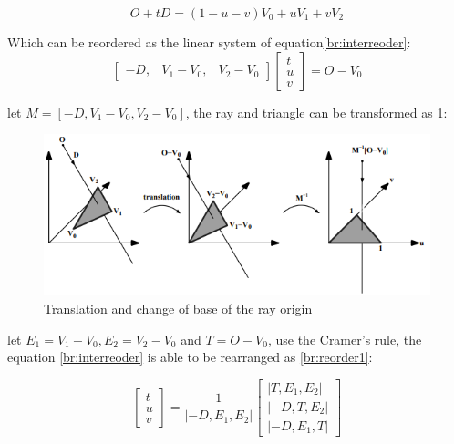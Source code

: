 \begin{equation}
    O+t D=(1-u-v) V_{0}+u V_{1}+v V_{2}
    \label{br:intersection}
\end{equation}

Which can be reordered as the linear system of equation\ref{br:interreoder}:
\begin{equation}
    \left[\begin{array}{lll}
        -D, & V_{1}-V_{0}, & V_{2}-V_{0}
        \end{array}\right]\left[\begin{array}{l}
        t \\
        u \\
        v
        \end{array}\right]=O-V_{0}
    \label{br:interreoder}
\end{equation}

let $ M=\left[-D, V_{1}-V_{0}, V_{2}-V_{0}\right] $, the ray and triangle can be transformed as \ref{br:trans}:
\begin{figure}[htbp]
    \centering
    \includegraphics[width=15cm]{Images/Chap2/intersection.png}
    \caption{Translation and change of base of the ray origin}
    \label{br:trans}
\end{figure}

let $ E_{1}=V_{1}-V_{0}, E_{2}=V_{2}-V_{0} $ and $ T=O-V_{0} $, use the Cramer's rule, the equation \ref{br:interreoder} is able to be rearranged as \ref{br:reorder1}:

\begin{equation}
    \begin{bmatrix}t
        \\u
        \\v
       \end{bmatrix}=\frac{1}{\left|-D,E_{1},E_{2}\right|}
       \begin{bmatrix}\left|T,E_{1},E_{2}\right| 
        \\\left|-D,T,E_{2}\right|
        \\\left|-D,E_{1},T\right|
       \end{bmatrix}
    \label{br:reorder1}
\end{equation}

